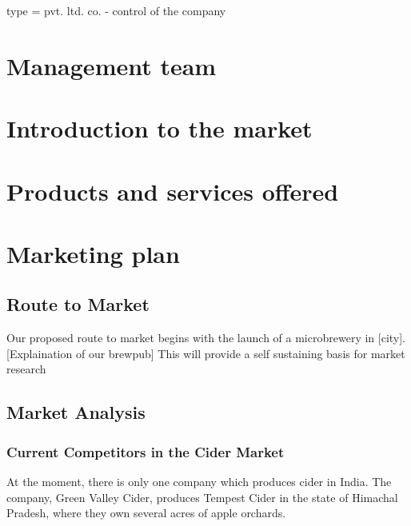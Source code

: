 \documentclass{article}
\begin{document}
type = pvt. ltd. co. - control of the company

\section{Management team}

\section{Introduction to the market}
\section{Products and services offered}
\section{Marketing plan}

\subsection{Route to Market}
Our proposed route to market begins with the launch of a microbrewery in [city].
[Explaination of our brewpub]
This will provide a self sustaining basis for market research


\subsection{Market Analysis}
\subsubsection{Current Competitors in the Cider Market}
At the moment, there is only one company which produces cider in India.
The company, Green Valley Cider, produces Tempest Cider in the state of Himachal
Pradesh, where they own several acres of apple orchards.
\end{document}
